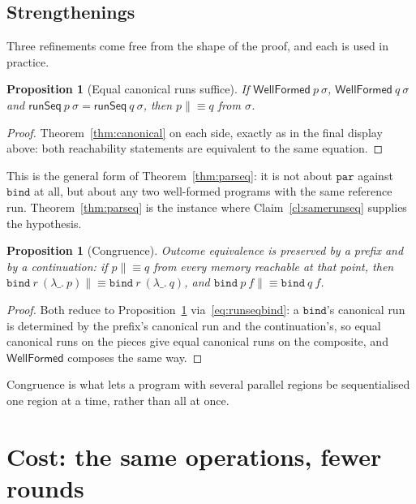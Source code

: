 \documentclass[11pt,a4paper]{article}
\theoremstyle{definition}
\theoremstyle{plain}
\newtheorem{proposition}[definition]{Proposition}
\theoremstyle{remark}
\newcommand{\st}{\sigma}
\newcommand{\runSeq}{\mathsf{runSeq}}
\newcommand{\wf}{\mathsf{WellFormed}}
\begin{document}
\subsection{Strengthenings}\label{sec:canonical:strength}

Three refinements come free from the shape of the proof, and each is used in practice.

\begin{proposition}[Equal canonical runs suffice]\label{prop:runseqeq}
If $\wf\ p\ \st$, $\wf\ q\ \st$ and $\runSeq\ p\ \st = \runSeq\ q\ \st$, then
$p \mathrel{\|\!\equiv} q$ from $\st$.
\end{proposition}

\begin{proof}
Theorem~\ref{thm:canonical} on each side, exactly as in the final display above: both
reachability statements are equivalent to the same equation.
\end{proof}

This is the general form of Theorem~\ref{thm:parseq}: it is not about $\texttt{par}$ against
$\texttt{bind}$ at all, but about any two well-formed programs with the same reference run.
Theorem~\ref{thm:parseq} is the instance where Claim~\ref{cl:samerunseq} supplies the
hypothesis.

\begin{proposition}[Congruence]\label{prop:bindcongr}
Outcome equivalence is preserved by a prefix and by a continuation: if
$p \mathrel{\|\!\equiv} q$ from every memory reachable at that point, then
$\texttt{bind}\ r\ (\lambda\_.\ p) \mathrel{\|\!\equiv} \texttt{bind}\ r\ (\lambda\_.\ q)$, and
$\texttt{bind}\ p\ f \mathrel{\|\!\equiv} \texttt{bind}\ q\ f$.
\end{proposition}

\begin{proof}
Both reduce to Proposition~\ref{prop:runseqeq} via~\eqref{eq:runseqbind}: a $\texttt{bind}$'s
canonical run is determined by the prefix's canonical run and the continuation's, so equal
canonical runs on the pieces give equal canonical runs on the composite, and $\wf$ composes
the same way.
\end{proof}

Congruence is what lets a program with several parallel regions be sequentialised one region
at a time, rather than all at once.

\section{Cost: the same operations, fewer rounds}\label{sec:cost}
\end{document}
